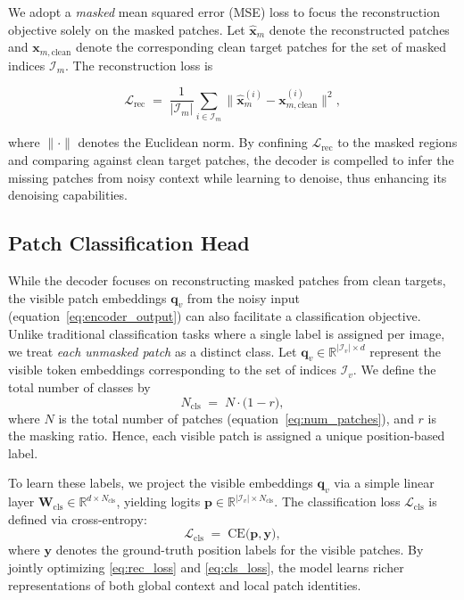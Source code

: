 We adopt a \emph{masked} mean squared error (MSE) loss to focus the 
reconstruction objective solely on the masked patches. Let \(\widehat{\mathbf{x}}_{m}\) denote the reconstructed patches and \(\mathbf{x}_{m,\text{clean}}\) denote the corresponding clean target patches for the set of masked indices \(\mathcal{I}_m\). The reconstruction loss is

\begin{equation}
    \mathcal{L}_{\mathrm{rec}}
    \;=\;
    \frac{1}{|\mathcal{I}_m|}
    \sum_{i \in \mathcal{I}_m}
    \bigl\|\widehat{\mathbf{x}}_{m}^{(i)} - \mathbf{x}_{m,\text{clean}}^{(i)}\bigr\|^{2},
\label{eq:rec_loss}
\end{equation}

where \(\|\cdot\|\) denotes the Euclidean norm. By confining 
\(\mathcal{L}_{\mathrm{rec}}\) to the masked regions and comparing against clean target patches, the decoder is compelled to infer the missing patches from noisy context while learning to denoise, thus enhancing its denoising capabilities.

\subsection{Patch Classification Head}

While the decoder focuses on reconstructing masked patches from clean targets,
the visible patch embeddings \(\mathbf{q}_{v}\) from the noisy input
(equation~\eqref{eq:encoder_output})
can also facilitate a classification objective. Unlike 
traditional classification tasks where a single label is assigned 
per image, we treat \emph{each unmasked patch} as a distinct class. 
Let \(\mathbf{q}_{v} \in \mathbb{R}^{|\mathcal{I}_v| \times d}\) 
represent the visible token embeddings corresponding to the set of 
indices \(\mathcal{I}_v\). We define the total number of classes by
\begin{equation}
  N_{\mathrm{cls}}
  \;=\;
  N \cdot \bigl(1 - r\bigr),
\label{eq:num_classes}
\end{equation}
where \(N\) is the total number of patches 
(equation~\eqref{eq:num_patches}), and \(r\) is the masking ratio. 
Hence, each visible patch is assigned a unique position-based label.

To learn these labels, we project the visible embeddings 
\(\mathbf{q}_{v}\) via a simple linear layer 
\(\mathbf{W}_{\mathrm{cls}} \in \mathbb{R}^{d \times N_{\mathrm{cls}}}\), 
yielding logits \(\mathbf{p} \in \mathbb{R}^{|\mathcal{I}_v| \times 
N_{\mathrm{cls}}}\). The classification loss \(\mathcal{L}_{\mathrm{cls}}\) 
is defined via cross-entropy:
\begin{equation}
  \mathcal{L}_{\mathrm{cls}}
  \;=\;
  \mathrm{CE}\bigl(\mathbf{p}, \mathbf{y}\bigr),
\label{eq:cls_loss}
\end{equation}
where \(\mathbf{y}\) denotes the ground-truth position labels for 
the visible patches. By jointly optimizing \eqref{eq:rec_loss} 
and \eqref{eq:cls_loss}, the model learns richer representations 
of both global context and local patch identities.



